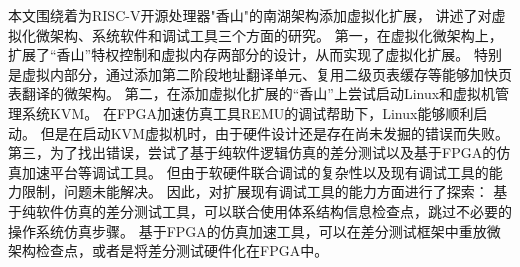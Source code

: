 \begin{conclusions}

本文围绕着为RISC-V开源处理器"香山"的南湖架构添加虚拟化扩展，
讲述了对虚拟化微架构、系统软件和调试工具三个方面的研究。
第一，在虚拟化微架构上，扩展了“香山”特权控制和虚拟内存两部分的设计，从而实现了虚拟化扩展。
特别是虚拟内部分，通过添加第二阶段地址翻译单元、复用二级页表缓存等能够加快页表翻译的微架构。
第二，在添加虚拟化扩展的“香山”上尝试启动Linux和虚拟机管理系统KVM。
在FPGA加速仿真工具REMU的调试帮助下，Linux能够顺利启动。
但是在启动KVM虚拟机时，由于硬件设计还是存在尚未发掘的错误而失败。
第三，为了找出错误，尝试了基于纯软件逻辑仿真的差分测试以及基于FPGA的仿真加速平台等调试工具。
但由于软硬件联合调试的复杂性以及现有调试工具的能力限制，问题未能解决。
因此，对扩展现有调试工具的能力方面进行了探索：
基于纯软件仿真的差分测试工具，可以联合使用体系结构信息检查点，跳过不必要的操作系统仿真步骤。
基于FPGA的仿真加速工具，可以在差分测试框架中重放微架构检查点，或者是将差分测试硬件化在FPGA中。

\end{conclusions}
